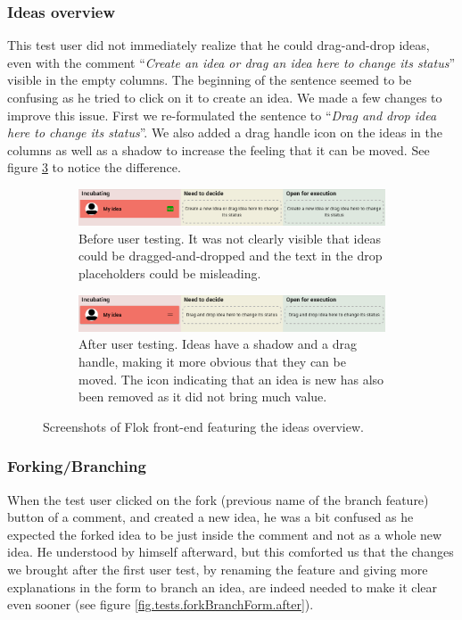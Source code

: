 \documentclass[a4paper,12pt,twoside]{article}
\begin{document}
\subsubsection*{Ideas overview}
This test user did not immediately realize that he could drag-and-drop ideas, even with the comment “\emph{Create an idea or drag an idea here to change its status}” visible in the empty columns.
The beginning of the sentence seemed to be confusing as he tried to click on it to create an idea.
We made a few changes to improve this issue.
First we re-formulated the sentence to “\emph{Drag and drop idea here to change its status}”.
We also added a drag handle icon on the ideas in the columns as well as a shadow to increase the feeling that it can be moved.
See figure \ref{fig.tests.ideasOverview} to notice the difference.

\begin{figure}[!htb]
    \begin{subfigure}[t]{\textwidth}
        \includegraphics[width=\textwidth]{images/user_tests/ideasOverview_before.png}
        \caption{Before user testing. It was not clearly visible that ideas could be dragged-and-dropped and the text in the drop placeholders could be misleading.}
        \label{fig.tests.ideasOverview.before}
    \end{subfigure}
    \begin{subfigure}[t]{\textwidth}
        \includegraphics[width=\textwidth]{images/user_tests/ideasOverview_after.png}
        \caption{After user testing. Ideas have a shadow and a drag handle, making it more obvious that they can be moved. The icon indicating that an idea is new has also been removed as it did not bring much value.}
        \label{fig.tests.ideasOverview.after}
    \end{subfigure}
    \caption{Screenshots of Flok front-end featuring the ideas overview.}
    \label{fig.tests.ideasOverview}
\end{figure}

\subsubsection*{Forking/Branching}
When the test user clicked on the fork (previous name of the branch feature) button of a comment, and created a new idea, he was a bit confused as he expected the forked idea to be just inside the comment and not as a whole new idea.
He understood by himself afterward, but this comforted us that the changes we brought after the first user test, by renaming the feature and giving more explanations in the form to branch an idea, are indeed needed to make it clear even sooner (see figure \ref{fig.tests.forkBranchForm.after}).
\end{document}

